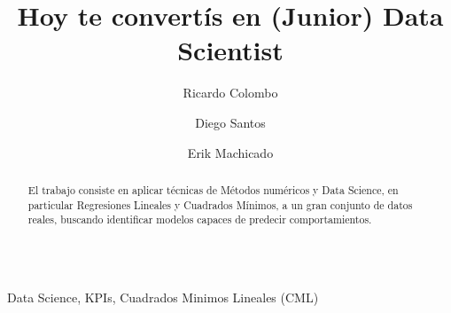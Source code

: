 \documentclass{endm}
\begin{document}
\begin{verbatim}\end{verbatim}\vspace{2.5cm}

\begin{frontmatter}

\title{Hoy te convert\'is en (Junior) Data Scientist}

\author{Ricardo Colombo}
\author{Diego Santos}
\author{Erik Machicado}
\address{Departamento de Computaci\'on\\ Universidad de Buenos Aires\\ C.A.B.A, Argentina}



\begin{abstract}
El trabajo consiste en aplicar t\'ecnicas de M\'etodos num\'ericos y 
Data Science, en particular Regresiones Lineales y Cuadrados M\'inimos, 
a un gran conjunto de datos reales, buscando identificar modelos 
capaces de predecir comportamientos.
\end{abstract}

\begin{keyword}
Data Science, KPIs, Cuadrados Minimos Lineales (CML)
\end{keyword}

\end{frontmatter}
\end{document}
